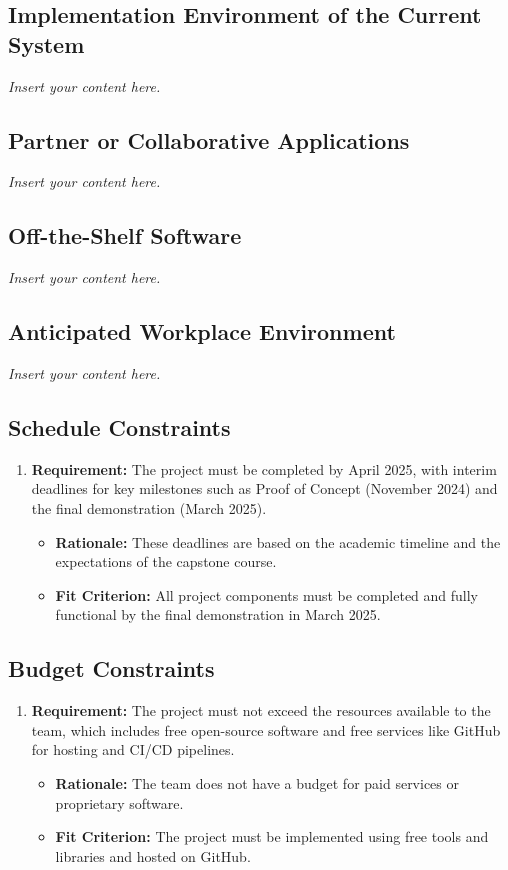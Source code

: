 \documentclass[12pt]{article}
\newcommand{\lips}{\textit{Insert your content here.}}
\begin{document}
\subsection{Implementation Environment of the Current System}
\lips
\subsection{Partner or Collaborative Applications}
\lips
\subsection{Off-the-Shelf Software}
\lips
\subsection{Anticipated Workplace Environment}
\lips
\subsection{Schedule Constraints}
\begin{enumerate}
    \item \textbf{Requirement:} The project must be completed by April 2025, with interim deadlines for key milestones such as Proof of Concept (November 2024) and the final demonstration (March 2025).
    \begin{itemize}
        \item \textbf{Rationale:} These deadlines are based on the academic timeline and the expectations of the capstone course.
        \item \textbf{Fit Criterion:} All project components must be completed and fully functional by the final demonstration in March 2025.
    \end{itemize}
\end{enumerate}
\subsection{Budget Constraints}
\begin{enumerate}
    \item \textbf{Requirement:} The project must not exceed the resources available to the team, which includes free open-source software and free services like GitHub for hosting and CI/CD pipelines.
    \begin{itemize}
        \item \textbf{Rationale:} The team does not have a budget for paid services or proprietary software.
        \item \textbf{Fit Criterion:} The project must be implemented using free tools and libraries and hosted on GitHub.
    \end{itemize}
\end{enumerate}
\end{document}

